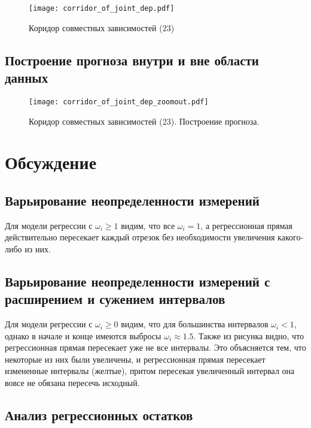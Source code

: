 \documentclass{article}
\begin{document}
\begin{figure}[H]
		\centering
		\texttt{[image: corridor\_of\_joint\_dep.pdf]}
		\caption{Коридор совместных зависимостей (23)}
	\end{figure}
	
	\subsection{Построение прогноза внутри и вне области данных}
	
	

 \begin{figure}[H]
		\centering
		\texttt{[image: corridor\_of\_joint\_dep\_zoomout.pdf]}
		\caption{Коридор совместных зависимостей (23). Построение прогноза.}
	\end{figure}

 \newpage
	\section{Обсуждение}
	
	\subsection{Варьирование неопределенности измерений}
	
	Для модели регрессии с $\omega_i \geq 1$ видим, что все $\omega_i = 1$, а регрессионная прямая действительно пересекает каждый отрезок без необходимости увеличения какого-либо из них.
	
	\subsection{Варьирование неопределенности измерений с расширением и сужением интервалов}
	
	Для модели регрессии с $\omega_i \geq 0$ видим, что для большинства интервалов $\omega_i < 1$, однако в начале и конце имеются выбросы $\omega_i \approx 1.5$. Также из рисунка видно, что регрессионная прямая пересекает уже не все интервалы. Это объясняется тем, что некоторые из них были увеличены, и регрессионная прямая пересекает измененные интервалы (желтые), притом пересекая увеличенный интервал она вовсе не обязана пересечь исходный.
	
	\subsection{Анализ регрессионных остатков}
	
\end{document}
